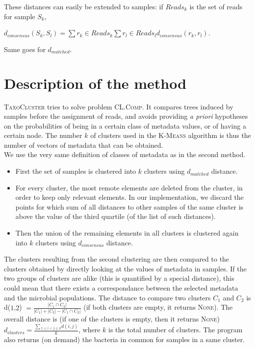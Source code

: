 \documentclass{report}
\begin{document}
\item These distances can easily be extended to samples: if $Reads_{k}$ is the set of reads for sample $S_{k}$,\\
\begin{center}
$d_{consensus}(S_{k},S_{l}) = \sum{r_{k} \in Reads_{k}}{\sum{r_{l} \in Reads_{l}}{d_{consensus}(r_{k},r_{l})}}$.
\end{center} 

Same goes for $d_{matched}$.

\section{Description of the method}

\textsc{TaxoCluster} tries to solve problem \textsc{CL.Comp}. It compares trees induced by samples before the assignment of reads, and avoids providing \emph{a priori} hypotheses on the probabilities of being in a certain class of metadata values, or of having a certain node. The number $k$ of clusters used in the \textsc{K-Means} algorithm is thus the number of vectors of metadata that can be obtained.\\

We use the very same definition of classes of metadata as in the second method.

\begin{itemize}
\item First the set of samples is clustered into $k$ clusters using $d_{matched}$ distance. 
\item For every cluster, the most remote elements are deleted from the cluster, in order to keep only relevant elements. In our implementation, we discard the points for which sum of all distances to other samples of the same cluster is above the value of the third quartile (of the list of such distances).
\item Then the union of the remaining elements in all clusters is clustered again into $k$ clusters using $d_{consensus}$ distance.
\end{itemize}

The clusters resulting from the second clustering are then compared to the clusters obtained by directly looking at the values of metadata in samples. If the two groups of clusters are alike (this is quantified by a special distance), this could mean that there exists a correspondance between the selected metadata and the microbial populations. The distance to compare two clusters \textsc{$C_{1}$} and \textsc{$C_{2}$} is d($1$,$2$) $= \frac{|C_{1} \cap C_{2}|}{|C_{1}| + |C_{2}| - |C_{1} \cap C_{2}|} $ (if both clusters are empty, it returns \textsc{None}). The overall distance is (if one of the clusters is empty, then it returns \textsc{None}) $d_{clusters} = \frac{\sum{_{1 \le i < j \le k}}{d(i,j)}}{k}$, where $k$ is the total number of clusters. The program also returns (on demand) the bacteria in common for samples in a same cluster.\\
\end{document}
